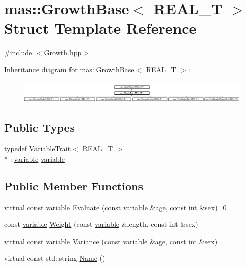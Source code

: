 \hypertarget{structmas_1_1_growth_base}{\section{mas\-:\-:Growth\-Base$<$ R\-E\-A\-L\-\_\-\-T $>$ Struct Template Reference}
\label{structmas_1_1_growth_base}
}


{\ttfamily \#include $<$Growth.\-hpp$>$}

Inheritance diagram for mas\-:\-:Growth\-Base$<$ R\-E\-A\-L\-\_\-\-T $>$\-:\begin{figure}[H]
\begin{center}
\leavevmode
\includegraphics[height=1.111111cm]{structmas_1_1_growth_base}
\end{center}
\end{figure}
\subsection*{Public Types}
\begin{DoxyCompactItemize}
\item 
typedef \hyperlink{structmas_1_1_variable_trait}{Variable\-Trait}$<$ R\-E\-A\-L\-\_\-\-T $>$\\*
\-::\hyperlink{structmas_1_1_growth_base_a2b2f3559be1ce3134ab0a145fa3a8f43}{variable} \hyperlink{structmas_1_1_growth_base_a2b2f3559be1ce3134ab0a145fa3a8f43}{variable}
\end{DoxyCompactItemize}
\subsection*{Public Member Functions}
\begin{DoxyCompactItemize}
\item 
virtual const \hyperlink{structmas_1_1_growth_base_a2b2f3559be1ce3134ab0a145fa3a8f43}{variable} \hyperlink{structmas_1_1_growth_base_a381e3400e22b2739830351acdf4689b5}{Evaluate} (const \hyperlink{structmas_1_1_growth_base_a2b2f3559be1ce3134ab0a145fa3a8f43}{variable} \&age, const int \&sex)=0
\item 
const \hyperlink{structmas_1_1_growth_base_a2b2f3559be1ce3134ab0a145fa3a8f43}{variable} \hyperlink{structmas_1_1_growth_base_afa288d34bcad493a5a893ffe8d3c0920}{Weight} (const \hyperlink{structmas_1_1_growth_base_a2b2f3559be1ce3134ab0a145fa3a8f43}{variable} \&length, const int \&sex)
\item 
virtual const \hyperlink{structmas_1_1_growth_base_a2b2f3559be1ce3134ab0a145fa3a8f43}{variable} \hyperlink{structmas_1_1_growth_base_a74588899b86934b281e51b8a4fb15876}{Variance} (const \hyperlink{structmas_1_1_growth_base_a2b2f3559be1ce3134ab0a145fa3a8f43}{variable} \&age, const int \&sex)
\item 
virtual const std\-::string \hyperlink{structmas_1_1_growth_base_a3645c79a5cd9ed606bcf2f381aef5259}{Name} ()
\end{DoxyCompactItemize}
